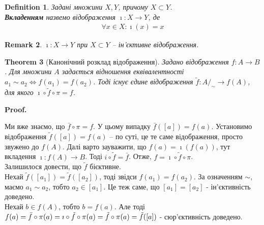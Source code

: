 \documentclass[a4paper, 14pt]{extarticle}
\makeatletter
\theoremstyle{theoremdd}
\newtheorem{theorem}{Theorem}[subsection]
\theoremstyle{theoremdd}
\newtheorem{definition}[theorem]{Definition}
\theoremstyle{theoremdd}
\theoremstyle{theoremdd}
\theoremstyle{theoremdd}
\theoremstyle{theoremdd}
\theoremstyle{theoremdd}
\theoremstyle{theoremdd}
\theoremstyle{theoremdd}
\theoremstyle{theoremdd}
\theoremstyle{theoremdd}
\newtheorem{remark}[theorem]{Remark}
\theoremstyle{theoremdd}
\theoremstyle{theoremdd}
\theoremstyle{theoremdd}
\theoremstyle{theoremdd}
\renewenvironment{proof}[1][Proof.\\]{\par
\pushQED{\hfill \qed}%
\normalfont \topsep6\p@\@plus6\p@\relax
\trivlist
\item\relax
{\bfseries
#1\@addpunct{.}}\hspace\labelsep\ignorespaces
}{%
\popQED\endtrivlist\@endpefalse
}
\makeatother
\begin{document}
\begin{definition}
Задані множини $X,Y$, причому $X \subset Y$.\\
\textbf{Вкладенням} назвемо відображення $\imath \colon X \to Y$, де
\begin{align*}
\forall x \in X: \imath(x) = x
\end{align*}
\end{definition}

\begin{remark}
$\imath \colon X \to Y$ при $X \subset Y$ -- ін'єктивне відображення.
\end{remark}

\begin{theorem}[Канонічний розклад відображення]
Задано відображення $f \colon A \to B$. Для множини $A$ задається відношення еквівалентності $a_1 \sim a_2 \iff f(a_1) = f(a_2)$. Тоді існує єдине відображення $\tilde{f} \colon A/_\sim \to f(A)$, для якого $\imath \circ \tilde{f} \circ \pi = f$.
\begin{figure}[H]
\centering
{}
\end{figure}
\end{theorem}

\begin{proof}
Ми вже знаємо, що $\bar{f} \circ \pi = f$. У цьому випадку $\bar{f}([a]) = f(a)$. Установимо відображення $\tilde{f}([a]) = f(a)$ -- по суті, це те саме відображення, просто звужено до $f(A)$. Далі варто зауважити, що $f(a) = \imath (f(a))$, тут вкладення $\imath \colon f(A) \to B$. Тоді $i \circ \tilde{f} = \bar{f}$. Отже, $f = \imath \circ \tilde{f} \circ \pi$.\\
Залишилося довести, що $\tilde{f}$ бієктивне.\\
Нехай $\tilde{f}([a_1]) = \tilde{f}([a_2])$, тоді звідси $f(a_1) = f(a_2)$. За означенням $\sim$, маємо $a_1 \sim a_2$, тобто $a_2 \in [a_1]$. Це теж саме, що $[a_1] = [a_2]$ - ін'єктивність доведено.\\
Нехай $b \in f(A)$, тобто $b = f(a)$. Але тоді $f(a) = \bar{f} \circ \pi (a) = \imath \circ \tilde{f} \circ \pi(a) \\ = \tilde{f} \circ \pi(a) = \tilde{f}([a])$ - сюр'єктивність доведено.
\end{proof}
\end{document}
